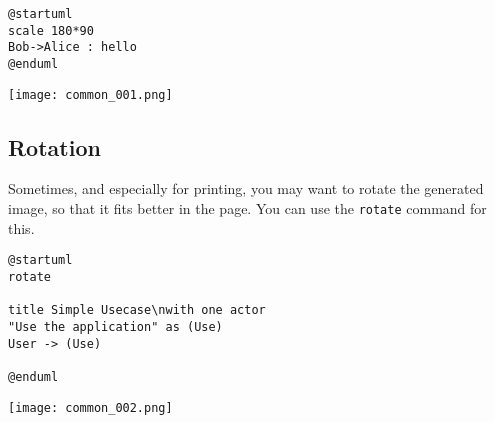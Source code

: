 \begin{lstlisting}
@startuml
scale 180*90
Bob->Alice : hello
@enduml 

\end{lstlisting}

\begin{center}
\texttt{[image: common\_001.png]}
\end{center}


\newpage \subsection{Rotation} 

Sometimes, and especially for printing, you may want to rotate the generated image, so that it fits 
better in the page. 
You can use the \texttt{rotate} command for this. 

\begin{lstlisting}
@startuml
rotate

title Simple Usecase\nwith one actor 
"Use the application" as (Use)
User -> (Use) 

@enduml 

\end{lstlisting}

\begin{center}
\texttt{[image: common\_002.png]}
\end{center}

